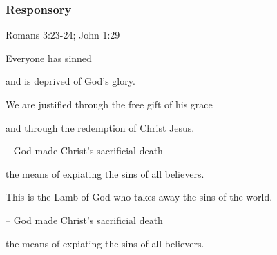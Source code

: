 \subsubsection{Responsory}

\hfill Romans 3:23-24; John 1:29

Everyone has sinned\par
and is deprived of God’s glory.\par
We are justified through the free gift of his grace\par
and through the redemption of Christ Jesus.\par
– God made Christ’s sacrificial death\par
the means of expiating the sins of all believers.\par
\vspace{5pt}
This is the Lamb of God who takes away the sins of the world.\par
– God made Christ’s sacrificial death\par
the means of expiating the sins of all believers.\par
